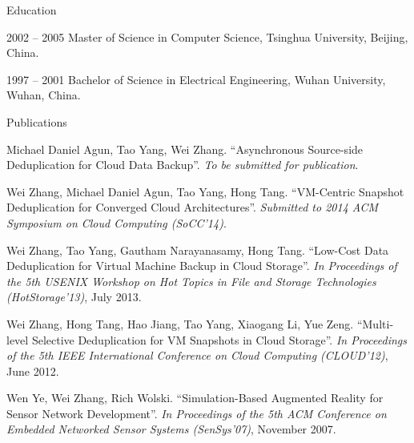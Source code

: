 \begin{vitae}
{\small

\begin{vitaesection}{Education}
\vspace{-0.1cm}
   \item [2002 -- 2005] Master of Science in Computer Science, Tsinghua University, Beijing, China.
    
   \item [1997 -- 2001] Bachelor of Science in Electrical Engineering, Wuhan University, Wuhan, China.

\end{vitaesection}



\begin{vitaesection}{Publications}
\item Michael Daniel Agun, Tao Yang, Wei Zhang. ``Asynchronous Source-side Deduplication for Cloud Data Backup''. {\it To be submitted for publication}.

\item Wei Zhang, Michael Daniel Agun, Tao Yang, Hong Tang. ``VM-Centric Snapshot Deduplication for Converged Cloud Architectures''. {\it Submitted to 2014 ACM Symposium on Cloud Computing (SoCC'14)}.

\item Wei Zhang, Tao Yang, Gautham Narayanasamy, Hong Tang. ``Low-Cost Data Deduplication for Virtual Machine Backup in Cloud Storage''. {\it In Proceedings of the 5th USENIX Workshop on Hot Topics in File and Storage Technologies (HotStorage'13)}, July 2013.

\item Wei Zhang, Hong Tang, Hao Jiang, Tao Yang, Xiaogang Li, Yue Zeng. ``Multi-level Selective Deduplication for VM Snapshots in Cloud Storage''. {\it In Proceedings of the 5th IEEE International Conference on Cloud Computing (CLOUD'12)}, June 2012.

\item Wen Ye, Wei Zhang, Rich Wolski. ``Simulation-Based Augmented Reality for Sensor Network Development''. {\it In Proceedings of the 5th ACM Conference on Embedded Networked Sensor Systems (SenSys'07)}, November 2007.


\end{vitaesection}}
\end{vitae}
